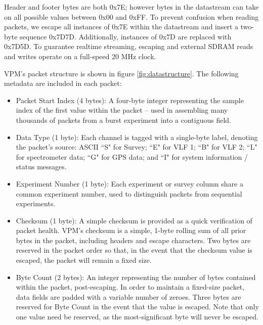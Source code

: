 Header and footer bytes are both 0x7E; however bytes in the datastream can take on all possible values between 0x00 and 0xFF. To prevent confusion when reading packets, we escape all instances of 0x7E within the datastream and insert a two-byte sequence 0x7D7D. Additionally, instances of 0x7D are replaced with 0x7D5D. To guarantee realtime streaming, escaping and external SDRAM reads and writes operate on a full-speed 20 MHz clock. 

VPM's packet structure is shown in figure \ref{fig:datastructure}. The following metadata are included in each packet:
\begin{itemize}
\item Packet Start Index (4 bytes): A four-byte integer representing the sample index of the first value within the packet -- used in assembling many thousands of packets from a burst experiment into a contiguous field.
\item Data Type (1 byte): Each channel is tagged with a single-byte label, denoting the packet's source: ASCII ``S" for Survey; ``E" for VLF 1; ``B" for VLF 2; ``L" for spectrometer data; ``G" for GPS data; and ``I" for system information / status messages.
\item Experiment Number (1 byte): Each experiment or survey column share a common experiment number, used to distinguish packets from sequential experiments.
\item Checksum (1 byte): A simple checksum is provided as a quick verification of packet health. VPM's checksum is a simple, 1-byte rolling sum of all prior bytes in the packet, including headers and escape characters. Two bytes are reserved in the packet order so that, in the event that the checksum value is escaped, the packet will remain a fixed size.

\item Byte Count (2 bytes): An integer representing the number of bytes contained within the packet, post-escaping. In order to maintain a fixed-size packet, data fields are padded with a variable number of zeroes. Three bytes are reserved for Byte Count in the event that the value is escaped. Note that only one value need be reserved, as the most-significant byte will never be escaped.
\end{itemize}

